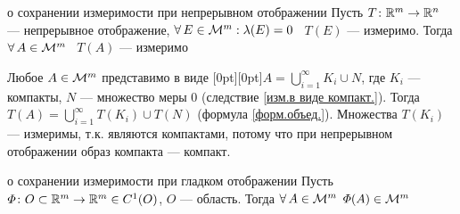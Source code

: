 
\begin{lem}[https://www.youtube.com/live/Y10gq1j3ADI?si=-TzW_Myt1TIwVTsR&t=4307]{о сохранении измеримости при непрерывном отображении}\label{сохр.изм.гл.отобр.}%
	Пусть $T \colon \mathbb R^m \to \mathbb R^n$ --- непрерывное отображение, $\forall \, E \in \mathcal{M}^m : \lambda(E) = 0$ \ $T(E)$ --- измеримо. Тогда $\forall \, A \in \mathcal{M}^m$ \ $T(A)$ --- измеримо
\end{lem}

\begin{prf}
	Любое $A \in \mathcal{M}^m$ представимо в виде \raisebox{0pt}[0pt][0pt]{$A = \bigcup\limits_{i = 1}^\infty K_i \cup N$}, где $K_i$ --- компакты, $N$ --- множество меры 0 (следствие \ref{изм.в виде компакт.}). Тогда $T(A) = \bigcup\limits_{i = 1}^\infty T(K_i) \cup T(N)$ (формула \ref{форм.объед.}). Множества $T(K_i)$ --- измеримы, т.к. являются компактами, потому что при непрерывном отображении образ компакта --- компакт. 
\end{prf}

\begin{lem}[https://www.youtube.com/live/Y10gq1j3ADI?si=IRliD795RU_1fBzG&t=6832]{о сохранении измеримости при гладком отображении}\label{о сохр.изм.при гл.отобр.}
	Пусть $\varPhi \colon O \subset \mathbb R^m \to \mathbb R^m \in C^1(O)$, $O$ --- область. Тогда $\forall \, A \in \mathcal{M}^m$ $\varPhi(A) \in \mathcal{M}^m$
\end{lem}

